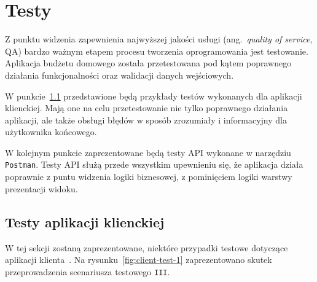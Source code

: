 \chapter{Testy}
\label{chap:testy}

Z punktu widzenia zapewnienia najwyższej jakości usługi (ang.~\emph{quality of service}, QA) bardzo ważnym etapem procesu tworzenia oprogramowania jest testowanie. Aplikacja budżetu domowego została przetestowana pod kątem poprawnego działania funkcjonalności oraz walidacji danych wejściowych.

W punkcie~\ref{sec:test-client} przedstawione będą przykłady testów wykonanych dla aplikacji klienckiej. Mają one na celu przetestowanie nie tylko poprawnego działania aplikacji, ale także obsługi błędów w sposób zrozumiały i informacyjny dla użytkownika końcowego.

W kolejnym punkcie zaprezentowane będą testy API wykonane w narzędziu \texttt{Postman}. Testy API służą przede wszystkim upewnieniu się, że aplikacja działa poprawnie z puntu widzenia logiki biznesowej, z pominięciem logiki warstwy prezentacji widoku.

\section{Testy aplikacji klienckiej}
\label{sec:test-client}

W tej sekcji zostaną zaprezentowane, niektóre przypadki testowe dotyczące aplikacji klienta~\cite{test-case}. Na rysunku~\ref{fig:client-test-1} zaprezentowano skutek przeprowadzenia scenariusza testowego \texttt{III}.

